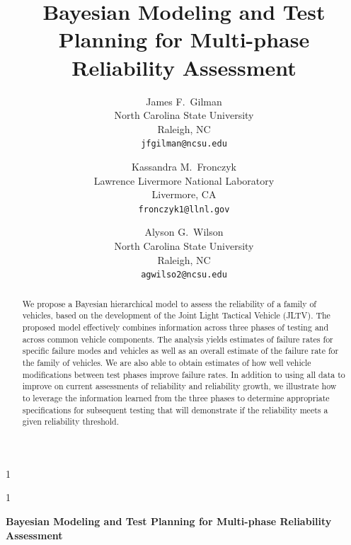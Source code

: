 \documentclass[12pt]{article}
\newcommand{\blind}{1}
\begin{document}
%

\def\spacingset#1{\renewcommand{\baselinestretch}%
{#1}\small\normalsize} \spacingset{1}


\blind
{
\title{Bayesian Modeling and Test Planning for Multi-phase Reliability Assessment}

\author{James F.\ Gilman\\North Carolina State University\\Raleigh, NC\\\texttt{jfgilman@ncsu.edu} \and
Kassandra M.\ Fronczyk\\Lawrence Livermore National Laboratory\\Livermore, CA\\\texttt{fronczyk1@llnl.gov} \and
Alyson G.\ Wilson\\North Carolina State University\\Raleigh, NC\\\texttt{agwilso2@ncsu.edu}}
\maketitle} \fi

\blind
{
  \bigskip
  \bigskip
  \bigskip
  \begin{center}
    {\LARGE\bf Bayesian Modeling and Test Planning for Multi-phase Reliability Assessment}
\end{center}
  \medskip
} \fi

\bigskip

\begin{abstract}
    We propose a Bayesian hierarchical model to assess the reliability of a family of vehicles, based on the development of the Joint
    Light Tactical Vehicle (JLTV). The proposed
    model effectively combines information across three phases of testing and
    across common vehicle components. The analysis yields estimates of failure
    rates for specific failure modes and vehicles as well as an overall estimate
    of the failure rate for the family of vehicles. We are also able to obtain
    estimates of how well vehicle modifications between test phases improve
    failure rates. In addition to using all data to improve on current
    assessments of reliability and reliability growth, we illustrate how to
    leverage the information learned from the three phases to determine
    appropriate specifications for subsequent testing that will demonstrate if
    the reliability meets a given reliability threshold.
\end{abstract}
\end{document}
